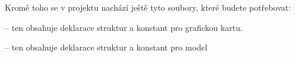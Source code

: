 Kromě toho se v projektu nachází ještě tyto soubory, které budete potřebovat\+:
\begin{DoxyItemize}
\item {} -- ten obsahuje deklarace struktur a konstant pro grafickou kartu.
\item {} -- ten obsahuje deklarace struktur a konstant pro model 
\end{DoxyItemize}